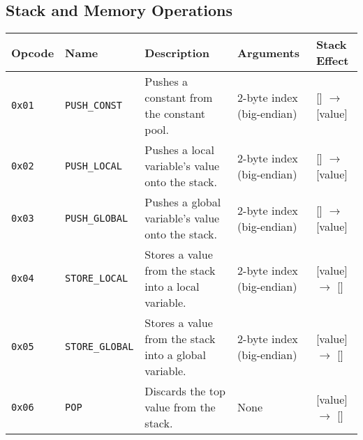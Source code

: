 \documentclass[a4paper,12pt]{article}
\begin{document}
    \subsection{Stack and Memory Operations}
    \begin{tabular}{|l|l|p{4cm}|l|l|}
    \hline
    \textbf{Opcode} & \textbf{Name} & \textbf{Description} & \textbf{Arguments} & \textbf{Stack Effect} \\ \hline
    \texttt{0x01} & \texttt{PUSH\_CONST} & Pushes a constant from the constant pool. & 2-byte index (big-endian) & [] $\rightarrow$ [value] \\ \hline
    \texttt{0x02} & \texttt{PUSH\_LOCAL} & Pushes a local variable's value onto the stack. & 2-byte index (big-endian) & [] $\rightarrow$ [value] \\ \hline
    \texttt{0x03} & \texttt{PUSH\_GLOBAL} & Pushes a global variable's value onto the stack. & 2-byte index (big-endian) & [] $\rightarrow$ [value] \\ \hline
    \texttt{0x04} & \texttt{STORE\_LOCAL} & Stores a value from the stack into a local variable. & 2-byte index (big-endian) & [value] $\rightarrow$ [] \\ \hline
    \texttt{0x05} & \texttt{STORE\_GLOBAL} & Stores a value from the stack into a global variable. & 2-byte index (big-endian) & [value] $\rightarrow$ [] \\ \hline
    \texttt{0x06} & \texttt{POP} & Discards the top value from the stack. & None & [value] $\rightarrow$ [] \\ \hline
    \end{tabular}
    \label{tab:stack_memory_operations}
\end{document}
